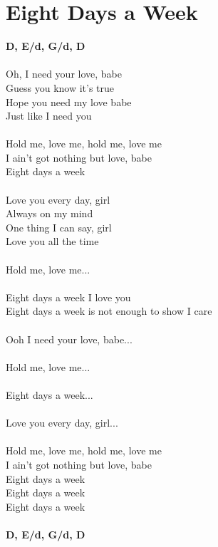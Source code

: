 \section{Eight Days a Week}
\footnotesize\textbf{D, E/d, G/d, D}\\
\normalsize
\\
Oh, I need your love, babe\\
Guess you know it's true\\
Hope you need my love babe\\
Just like I need you\\
\\
Hold me, love me, hold me, love me\\
I ain't got nothing but love, babe\\
Eight days a week\\
\\
Love you every day, girl\\
Always on my mind\\
One thing I can say, girl\\
Love you all the time\\
\\
Hold me, love me...\\
\\
Eight days a week I love you\\
Eight days a week is not enough to show I care\\
\\
Ooh I need your love, babe...\\
\\
Hold me, love me...\\
\\
Eight days a week...\\
\\
Love you every day, girl...\\
\\
Hold me, love me, hold me, love me\\
I ain't got nothing but love, babe\\
Eight days a week\\
Eight days a week\\
Eight days a week\\
\\
\footnotesize\textbf{D, E/d, G/d, D}\\
\normalsize